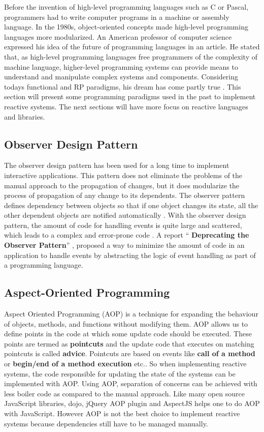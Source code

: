 Before the invention of high-level programming languages such as C or Pascal, programmers had to write computer programs in a machine or assembly language. In the 1980\textquotesingle s, object-oriented concepts made high-level programming languages more modularized. An American professor of computer science expressed his idea of the future of programming languages in an article. He stated that, as high-level programming languages free programmers of the complexity of machine language, higher-level programming systems can provide means to understand and manipulate complex systems and components. Considering today\textquotesingle s functional and RP paradigms, his dream has come partly true \cite{Winograd:1979:BPL:359131.359133}.
This section will present some programming paradigms used in the past to implement reactive systems. The next sections will have more focus on reactive languages and libraries.
\fi

\subsection{Observer Design Pattern}
The observer design pattern has been used for a long time to implement interactive applications. This pattern does not eliminate the problems of the manual approach to the propagation of changes, but it does modularize the process of propagation of any change to its dependents. The observer pattern defines dependency between objects so that if one object changes its state, all the other dependent objects are notified automatically \cite{Gamma:1995:DPE:186897}. With the observer design pattern, the amount of code for handling events is quite large and scattered, which leads to a complex and error-prone code \cite{Meyerovich:2009:FPL:1639949.1640091}. A report `` \textbf{Deprecating the Observer Pattern}'' \cite{EPFL-REPORT-176887}, proposed a way to minimize the amount of code in an application to handle events by abstracting the logic of event handling as part of a programming language.

\subsection{Aspect-Oriented Programming} \label{subsec:AOP}
Aspect Oriented Programming (AOP) is a technique for expanding the behaviour of objects, methods, and functions without modifying them. AOP allows us to define points in the code at which some update code should be executed. These points are termed as \textbf{pointcuts} and the update code that executes on matching pointcuts is called \textbf{advice}. Pointcuts are based on events like \textbf{call of a method} or \textbf{begin/end of a method execution} etc.. So when implementing reactive systems, the code responsible for updating the state of the systems can be implemented with AOP. Using AOP, separation of concerns can be achieved with less boiler code as compared to the manual approach. Like many open source JavaScript libraries, dojo\cite{dojo}, jQuery AOP plugin\cite{jqueryaop} and AspectJS\cite{AspectJs} helps one to do AOP with JavaScript. However AOP is not the best choice to implement reactive systems because dependencies still have to be managed manually.

